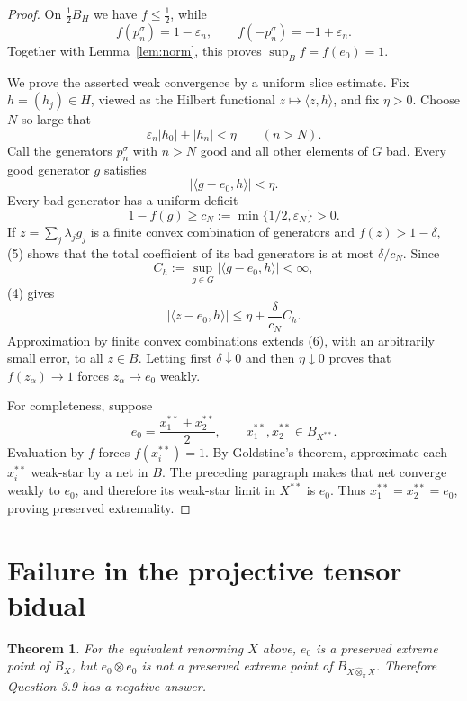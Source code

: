 \documentclass[11pt]{article}
\newtheorem{theorem}{Theorem}
\newcommand{\pt}{\widehat{\otimes}_{\pi}}
\begin{document}
\begin{proof}
On $\frac12B_H$ we have $f\leq\frac12$, while
\[
 f(p_n^\sigma)=1-\varepsilon_n,
 \qquad f(-p_n^\sigma)=-1+\varepsilon_n.
\]
Together with Lemma~\ref{lem:norm}, this proves
$\sup_B f=f(e_0)=1$.

We prove the asserted weak convergence by a uniform slice estimate.  Fix
$h=(h_j)\in H$, viewed as the Hilbert functional $z\mapsto\langle z,h\rangle$,
and fix $\eta>0$.  Choose $N$ so large that
\[
 \varepsilon_n|h_0|+|h_n|<\eta
 \qquad(n>N).
 \tag{3}
\]
Call the generators $p_n^\sigma$ with $n>N$ good and all other elements of
$G$ bad.  Every good generator $g$ satisfies
\[
 |\langle g-e_0,h\rangle|<\eta.
 \tag{4}
\]
Every bad generator has a uniform deficit
\[
 1-f(g)\geq c_N:=\min\{1/2,\varepsilon_N\}>0.
 \tag{5}
\]
If $z=\sum_j\lambda_jg_j$ is a finite convex combination of generators and
$f(z)>1-\delta$, (5) shows that the total coefficient of its bad generators
is at most $\delta/c_N$.  Since
\[
 C_h:=\sup_{g\in G}|\langle g-e_0,h\rangle|<\infty,
\]
(4) gives
\[
 |\langle z-e_0,h\rangle|
 \leq \eta+\frac{\delta}{c_N}C_h.
 \tag{6}
\]
Approximation by finite convex combinations extends (6), with an arbitrarily
small error, to all $z\in B$.  Letting first $\delta\downarrow0$ and then
$\eta\downarrow0$ proves that $f(z_\alpha)\to1$ forces
$z_\alpha\to e_0$ weakly.

For completeness, suppose
\[
 e_0=\frac{x_1^{**}+x_2^{**}}2,
 \qquad x_1^{**},x_2^{**}\in B_{X^{**}}.
 \]
Evaluation by $f$ forces $f(x_i^{**})=1$.  By Goldstine's theorem, approximate
each $x_i^{**}$ weak-star by a net in $B$.  The preceding paragraph makes
that net converge weakly to $e_0$, and therefore its weak-star limit in
$X^{**}$ is $e_0$.  Thus $x_1^{**}=x_2^{**}=e_0$, proving preserved
extremality.
\end{proof}

\section{Failure in the projective tensor bidual}

\begin{theorem}\label{thm:counterexample}
For the equivalent renorming $X$ above, $e_0$ is a preserved extreme point of
$B_X$, but $e_0\otimes e_0$ is not a preserved extreme point of
$B_{X\pt X}$.  Therefore Question 3.9 has a negative answer.
\end{theorem}
\end{document}

